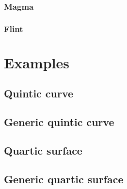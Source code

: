 \documentclass[a4paper,11pt]{article}
\numberwithin{equation}{section}
\theoremstyle{definition}
\begin{document}
\subsubsection{Magma}

\subsubsection{Flint}

\section{Examples}
\label{sec:Examples}

\subsection{Quintic curve}
\subsection{Generic quintic curve}
\subsection{Quartic surface}
\subsection{Generic quartic surface}




\end{document}
